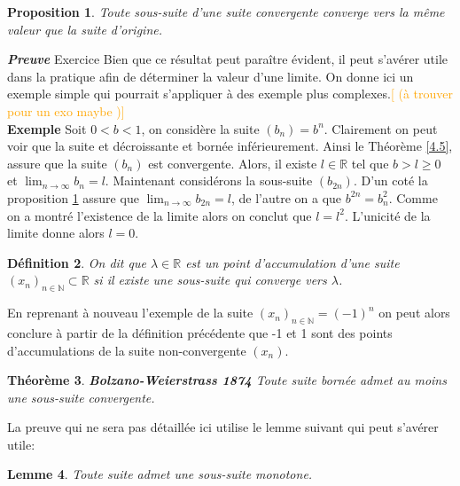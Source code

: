 \documentclass[a4paper, 12pt, french, twoside]{article}
\newtheorem{theorem}{Théorème}[section]
\newtheorem{lemma}[theorem]{Lemme}
\newtheorem{proposition}[theorem]{Proposition}
\newtheorem{defi}[theorem]{Définition}
\newcommand{\Nn}{{\mathbb{N}}}
\newcommand{\Rr}{{\mathbb{R}}}
\newcommand{\later}[1]{\textcolor{orange}{[#1]}}
\begin{document}
\begin{proposition}\label{2}
    Toute sous-suite d'une suite convergente converge vers la même valeur que la suite d'origine.  
\end{proposition}
\textit{\textbf{Preuve}} Exercice 
\newline 
Bien que ce résultat peut paraître évident, il peut s'avérer utile dans la pratique afin de déterminer la valeur d'une limite. On donne ici un exemple simple qui pourrait s'appliquer à des exemple plus complexes.\later{ (à trouver pour un exo maybe )}\newline \\
\textbf{Exemple} Soit $0<b<1$, on considère la suite $(b_n) = b^n$. Clairement on peut voir que la suite et décroissante et bornée inférieurement. Ainsi le Théorème \ref{4.5}, assure que la suite $(b_n)$ est convergente. Alors, il existe  $l \in \Rr$ tel que $b > l \ge 0$ et $\lim_{n \to \infty} b_n = l$. Maintenant considérons la sous-suite $(b_{2n})$. D'un coté la proposition \ref{2} assure que $\lim_{n \to \infty} b_{2n} = l$, de l'autre on a que $b^{2n} = b_n^2$. Comme on a montré l'existence de la limite alors on conclut que $l = l^2$. L'unicité de la limite donne alors $l=0$. \\


\begin{defi}\label{def422}
On dit que $\lambda \in \Rr $ est un point d'accumulation d'une suite $(x_n)_{n \in \Nn} \subset \Rr$ si il existe une sous-suite qui converge vers $\lambda$.
\end{defi}
En reprenant à nouveau l'exemple de la suite $(x_n)_{n \in \Nn} = (-1)^n$ on peut alors conclure à partir de la définition précédente que -1 et 1 sont des points d'accumulations de la suite non-convergente $(x_n)$.  
 
\begin{theorem}{\textbf{Bolzano-Weierstrass 1874}}
    Toute suite bornée admet au moins une sous-suite convergente. 
\end{theorem}
La preuve qui ne sera pas détaillée ici utilise le lemme suivant qui peut s'avérer utile:

\begin{lemma}
\label{peak point lemma}
    Toute suite admet une sous-suite monotone.
\end{lemma}



    
\end{document}
